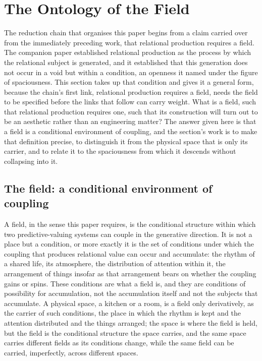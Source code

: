 \section{The Ontology of the Field}
\label{p22:sec:field-ontology}

\noindent
The reduction chain that organises this paper begins from a claim carried over from the immediately preceding work, that relational production requires a field. The companion paper established relational production as the process by which the relational subject is generated, and it established that this generation does not occur in a void but within a condition, an openness it named under the figure of spaciousness. This section takes up that condition and gives it a general form, because the chain's first link, relational production requires a field, needs the field to be specified before the links that follow can carry weight. What is a field, such that relational production requires one, such that its construction will turn out to be an aesthetic rather than an engineering matter? The answer given here is that a field is a conditional environment of coupling, and the section's work is to make that definition precise, to distinguish it from the physical space that is only its carrier, and to relate it to the spaciousness from which it descends without collapsing into it.

\subsection{The field: a conditional environment of coupling}
\label{p22:sub:field-definition}

A field, in the sense this paper requires, is the conditional structure within which two predictive-valuing systems can couple in the generative direction. It is not a place but a condition, or more exactly it is the set of conditions under which the coupling that produces relational value can occur and accumulate: the rhythm of a shared life, its atmosphere, the distribution of attention within it, the arrangement of things insofar as that arrangement bears on whether the coupling gains or spins. These conditions are what a field is, and they are conditions of possibility for accumulation, not the accumulation itself and not the subjects that accumulate. A physical space, a kitchen or a room, is a field only derivatively, as the carrier of such conditions, the place in which the rhythm is kept and the attention distributed and the things arranged; the space is where the field is held, but the field is the conditional structure the space carries, and the same space carries different fields as its conditions change, while the same field can be carried, imperfectly, across different spaces.

